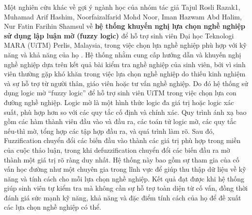 Một nghiên cứu khác về gợi ý ngành học của nhóm tác giả Tajul Rosli Razak1, Muhamad Arif Hashim, Noorfaizalfarid Mohd Noor, Iman Hazwam Abd Halim, Nur Fatin Farihin Shamsul về \textbf{hệ thống khuyến nghị lựa chọn nghề nghiệp sử dụng lập luận mờ (fuzzy logic)} để hỗ trợ sinh viên Đại học Teknologi MARA (UiTM) Perlis, Malaysia, trong việc chọn lựa nghề nghiệp phù hợp với kỹ năng và khả năng của họ \cite{tajul}. Hệ thống nhằm cung cấp hướng dẫn và khuyến nghị nghề nghiệp dựa trên kết quả bài kiểm tra nghề nghiệp của sinh viên, bởi vì sinh viên thường gặp khó khăn trong việc lựa chọn nghề nghiệp do thiếu kinh nghiệm và sự hỗ trợ từ người thân, giáo viên hoặc tư vấn nghề nghiệp. Do đó hệ thống sử dụng logic mờ “fuzzy logic” để hỗ trợ sinh viên UiTM trong việc chọn lựa con đường nghề nghiệp. Logic mờ là một hình thức logic đa giá trị hoặc logic xác suất, phù hợp hơn so với các quy tắc cố định và chính xác. Quy trình ánh xạ bao gồm các hàm thành viên đầu vào và đầu ra, các toán tử logic mờ, các quy tắc nếu-thì mờ, tổng hợp các tập hợp đầu ra, và quá trình làm rõ. Sau đó, Fuzzification chuyển đổi các biến đầu vào thành các giá trị phù hợp trong miền của cuộc thảo luận, trong khi defuzzification chuyển đổi các biến đầu ra mờ thành một giá trị rõ ràng duy nhất. Hệ thống này bao gồm sự tham gia của cố vấn học đường như một chuyên gia trong lĩnh vực để giúp thu thập dữ liệu về kỹ năng và tính cách cho mỗi lựa chọn nghề nghiệp. Kết quả đạt được khi hệ thống giúp sinh viên tự kiểm tra mà không cần sự hỗ trợ toàn diện từ cố vấn, đồng thời đánh giá sức mạnh kỹ năng, khả năng và đặc điểm tính cách của họ để đề xuất các lựa chọn nghề nghiệp có thể.

